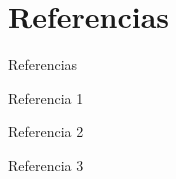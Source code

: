 \section{Referencias}

\begin{frame}{Referencias}
	\begin{thebibliography}{00}
		\beamertemplatebookbibitems
		Referencia 1
		
		\beamertemplateonlinebibitems
		Referencia 2
		
		\beamertemplatearticlebibitems
		Referencia 3
	\end{thebibliography}
\end{frame}